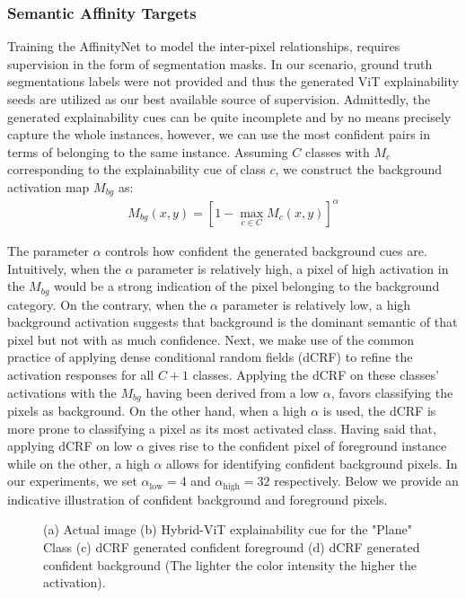 \subsubsection{Semantic Affinity Targets}
Training the AffinityNet to model the inter-pixel relationships, requires supervision in the form of segmentation masks. In our scenario, ground truth segmentations labels were not provided and thus the generated ViT explainability seeds are utilized as our best available source of supervision. Admittedly, the generated explainability cues can be quite incomplete and by no means precisely capture the whole instances, however, we can use the most confident pairs in terms of belonging to the same instance. Assuming $C$ classes with $M_{c}$ corresponding to the explainability cue of class $c$, we construct the background activation map $M_{bg}$ as:
\begin{align*}
M_{bg}(x,y) = [1 - \max\limits_{c\in C} M_c(x,y)]^\alpha
\end{align*}

The parameter $\alpha$ controls how confident the generated background cues are. Intuitively, when the $\alpha$ parameter is relatively high, a pixel of high activation in the $M_{bg}$ would be a strong indication of the pixel belonging to the background category. On the contrary, when the $\alpha$ parameter is relatively low, a high background activation suggests that background is the dominant semantic of that pixel but not with as much confidence. Next, we make use of the common practice of applying dense conditional random fields (dCRF) \cite{krahenbuhl2011efficient} to refine the activation responses for all $C+1$ classes. Applying the dCRF on these classes' activations with the $M_{bg}$ having been derived from a low $\alpha$, favors classifying the pixels as background. On the other hand, when a high $\alpha$ is used, the dCRF is more prone to classifying a pixel as its most activated class. Having said that, applying dCRF on low $\alpha$ gives rise to the confident pixel of foreground instance while on the other, a high $\alpha$ allows for identifying confident background pixels. In our experiments, we set $\alpha_\text{low} = 4$ and $\alpha_\text{high} = 32$ respectively. Below we provide an indicative illustration of confident background and foreground pixels. 

\begin{figure}[H]
    \centering
    \caption{(a) Actual image (b) Hybrid-ViT explainability cue for the "Plane" Class (c) dCRF generated confident foreground (d) dCRF generated confident background (The lighter the color intensity the higher the activation).}
    \label{fig:fig1}
\end{figure}

